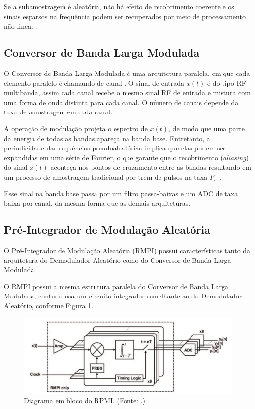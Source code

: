 \documentclass[a4paper, 12pt]{article}
\begin{document}
Se a subamostragem é aleatória, não há efeito de recobrimento coerente e os sinais esparsos na frequência podem ser recuperados por meio de processamento não-linear \cite{daponte2016prbs}.

\subsection{Conversor de Banda Larga Modulada}

O Conversor de Banda Larga Modulada é uma arquitetura paralela, em que cada elemento paralelo é chamando de canal \cite{Vanderson2017}. O sinal de entrada $x(t)$ é do tipo RF multibanda, assim cada canal recebe o mesmo sinal RF de entrada e mistura com uma forma de onda distinta para cada canal. O número de canais depende da taxa de amostragem em cada canal.

A operação de modulação projeta o espectro de $x(t)$, de modo que uma parte da energia de todas as bandas apareça na banda base. Entretanto, a periodicidade das sequências pseudoaleatórias implica que elas podem ser expandidas em uma série de Fourier, o que garante que o recobrimento (\textit{aliasing}) do sinal $x(t)$ aconteça nos pontos de cruzamento entre as bandas resultando em um processo de amostragem tradicional por trem de pulsos na taxa $F_s$ \cite{Bruno2019}.

Esse sinal na banda base passa por um filtro passa-baixas e um ADC de taxa baixa por canal, da mesma forma que as demais arquiteturas. 

\subsection{Pré-Integrador de Modulação Aleatória}

O Pré-Integrador de Modulação Aleatória (RMPI) possui características tanto da arquitetura do Demodulador Aleatório como do Conversor de Banda Larga Modulada. 

O RMPI possui a mesma estrutura paralela do Conversor de Banda Larga Modulada, contudo usa um circuito integrador semelhante ao do Demodulador Aleatório, conforme Figura \ref{fig:fig3}. 

\begin{figure}[h!]
    \centering
    \includegraphics{fig3.PNG}
    \caption{Diagrama em bloco do RPMI. (Fonte: \cite{Vanderson2017}.)}
    \label{fig:fig3}
\end{figure}{}
\end{document}
